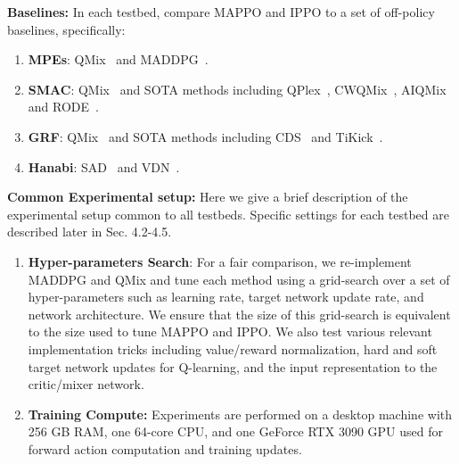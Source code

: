 \documentclass{article}
\theoremstyle{plain}
\theoremstyle{definition}
\theoremstyle{remark}
\begin{document}
\textbf{Baselines:}
In each testbed, compare MAPPO and IPPO to a set of off-policy baselines, specifically:
\begin{enumerate}[nolistsep,leftmargin=*]
    \item[$\bullet$] \textbf{MPEs}: QMix~\cite{pmlr-v80-rashid18a} and MADDPG~\cite{lowe2017multi}.
    \item[$\bullet$] \textbf{SMAC}: QMix~\cite{pmlr-v80-rashid18a} and SOTA methods including QPlex~\cite{wang2021qplex}, CWQMix~\cite{DBLP:conf/nips/RashidFPW20}, AIQMix~\cite{DBLP:journals/corr/abs-2006-04222} and RODE~\cite{wang2021rode}.
    \item[$\bullet$] \textbf{GRF}: QMix~\cite{pmlr-v80-rashid18a} and SOTA methods including CDS~\citep{li2021celebrating} and TiKick~\citep{huang2021tikick}.
    \item[$\bullet$] \textbf{Hanabi}: SAD~\cite{hu2019simplified} and VDN~\cite{sunehag2018value}.
\end{enumerate}

\textbf{Common Experimental setup: } Here we give a brief description of the experimental setup common to all testbeds. Specific settings for each testbed are described later in Sec. 4.2-4.5.
\begin{enumerate}[nolistsep,leftmargin=*]
\item[$\bullet$] \textbf{Hyper-parameters Search}: For a fair comparison, we re-implement MADDPG and QMix
and tune each method using a grid-search over a set of hyper-parameters such as learning rate, target network update rate, and network architecture. We ensure that the size of this grid-search is equivalent to the size used to tune MAPPO and IPPO. We also test various relevant implementation tricks including value/reward normalization, hard and soft target network updates for Q-learning, and the input representation to the critic/mixer network.
\item[$\bullet$] \textbf{Training Compute:} Experiments are performed on a desktop machine with 256 GB RAM, one 64-core CPU, and one GeForce RTX 3090 GPU used for forward action computation and training updates.
\end{enumerate}
\end{document}
